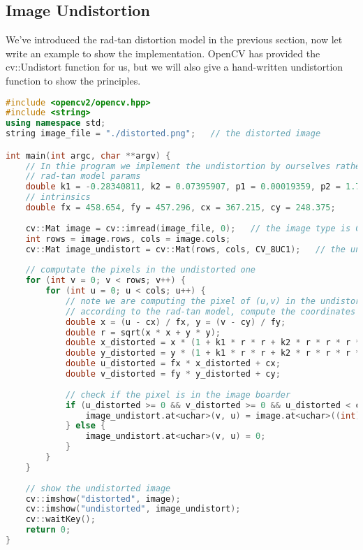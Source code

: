 \subsection{Image Undistortion}
We've introduced the rad-tan distortion model in the previous section, now let write an example to show the implementation. OpenCV has provided the cv::Undistort function for us, but we will also give a hand-written undistortion function to show the principles.

\begin{lstlisting}[language=C++,caption=slambook/ch5/imageBasics/undistortImage.cpp]
#include <opencv2/opencv.hpp>
#include <string>
using namespace std;
string image_file = "./distorted.png";   // the distorted image 

int main(int argc, char **argv) {
    // In thie program we implement the undistortion by ourselves rather than using opencv
    // rad-tan model params
    double k1 = -0.28340811, k2 = 0.07395907, p1 = 0.00019359, p2 = 1.76187114e-05;
    // intrinsics
    double fx = 458.654, fy = 457.296, cx = 367.215, cy = 248.375;
    
    cv::Mat image = cv::imread(image_file, 0);   // the image type is CV_8UC1
    int rows = image.rows, cols = image.cols;
    cv::Mat image_undistort = cv::Mat(rows, cols, CV_8UC1);   // the undistorted image
    
    // computate the pixels in the undistorted one
    for (int v = 0; v < rows; v++) {
        for (int u = 0; u < cols; u++) {
            // note we are computing the pixel of (u,v) in the undistorted image
            // according to the rad-tan model, compute the coordinates in the distorted image
            double x = (u - cx) / fx, y = (v - cy) / fy;
            double r = sqrt(x * x + y * y);
            double x_distorted = x * (1 + k1 * r * r + k2 * r * r * r * r) + 2 * p1 * x * y + p2 * (r * r + 2 * x * x);
            double y_distorted = y * (1 + k1 * r * r + k2 * r * r * r * r) + p1 * (r * r + 2 * y * y) + 2 * p2 * x * y;
            double u_distorted = fx * x_distorted + cx;
            double v_distorted = fy * y_distorted + cy;
            
            // check if the pixel is in the image boarder
            if (u_distorted >= 0 && v_distorted >= 0 && u_distorted < cols && v_distorted < rows) {
                image_undistort.at<uchar>(v, u) = image.at<uchar>((int) v_distorted, (int) u_distorted);
            } else {
                image_undistort.at<uchar>(v, u) = 0;
            }
        }
    }
    
    // show the undistorted image
    cv::imshow("distorted", image);
    cv::imshow("undistorted", image_undistort);
    cv::waitKey();
    return 0;
}
\end{lstlisting}

